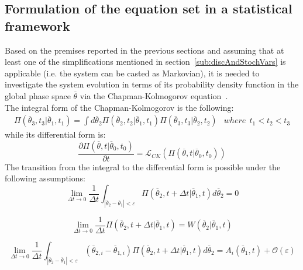 \subsection{Formulation of the equation set in a statistical framework}
Based on the premises reported in the previous sections and assuming 
that at least one of the simplifications mentioned in 
section~\ref{sub:discAndStochVars} is applicable (i.e. the system can be
casted as Markovian), it is needed to investigate the system evolution 
in terms of its probability density function in the global phase space 
$\overline{\theta}$ via the Chapman-Kolmogorov 
equation~\cite{ProbReactoDynamicsDevooght}.
\\The integral form of the Chapman-Kolmogorov is the following: 
\begin{equation}
\label{eq:chapKolmogIntegralForm}
\begin{matrix}
\Pi \left (\overline{\theta}_{3},t_{3}|\overline{\theta}_{1},t_{1}  \right ) = \int 
d\overline{\theta}_{2} \Pi\left (\overline{\theta}_{2},t_{2}|
\overline{\theta}_{1},t_{1}  \right )   \Pi\left (\overline{\theta}_{3},t_{3}|
\overline{\theta}_{2},t_{2}  \right )   & 
where \: \:   t_{1} < t_{2} < t_{3}
\end{matrix}
\end{equation}
while its differential form is:
\begin{equation}
\label{eq:chapKolmogDiffForm}
\frac{\partial \Pi \left (\overline{\theta},t|\overline{\theta}_{0},t_{0}  \right )  }{\partial t} =
\mathcal{L}_{CK}\left (   \Pi \left (\overline{\theta},t|\overline{\theta}_{0},t_{0}  \right ) \right )
\end{equation}
The transition from the integral to the differential form is possible under the following assumptions: 
\begin{equation}
\label{eq:chapKolmogAssump1}
\lim_{\Delta t \to 0} \frac{1}{\Delta t}  \int_{|
\overline{\theta}_{2}-\overline{\theta}_{1}|<\varepsilon }   \Pi \left 
(\overline{\theta}_{2},t+\Delta t|\overline{\theta}_{1},t  \right ) 
d\overline{\theta}_{2} = 0
\end{equation}

\begin{equation}
\label{eq:chapKolmogAssump2}
\lim_{\Delta t \to 0} \frac{1}{\Delta t} \Pi \left (\overline{\theta}_{2},t+\Delta t|
\overline{\theta}_{1},t  \right ) = W\left ( \overline{\theta}_{2}|
\overline{\theta}_{1},t \right )
\end{equation}

\begin{equation}
\label{eq:chapKolmogAssump3}
\lim_{\Delta t \to 0} \frac{1}{\Delta t}  \int_{|
\overline{\theta}_{2}-\overline{\theta}_{1}|<\varepsilon }   
\left ( \overline{\theta}_{2,i} - \overline{\theta}_{1,i} \right )
\Pi \left (\overline{\theta}_{2},t+\Delta t|\overline{\theta}_{1},t  \right ) 
d\overline{\theta}_{2} = A_{i}\left ( \overline{\theta}_{1},t \right ) + 
\mathcal{O}\left ( \varepsilon \right )
\end{equation}

